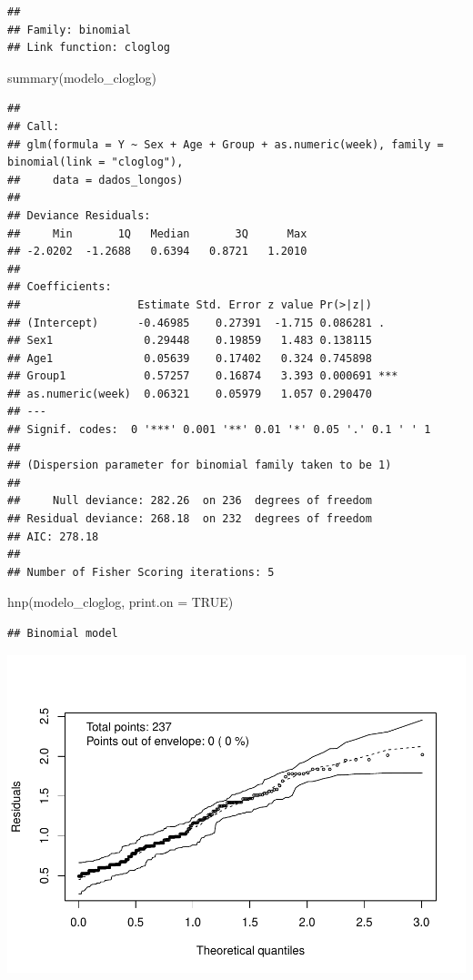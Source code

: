 \documentclass[
]{article}
\newenvironment{Shaded}{\begin{snugshade}}{\end{snugshade}}
\newcommand{\AttributeTok}[1]{\textcolor[rgb]{0.77,0.63,0.00}{#1}}
\newcommand{\ConstantTok}[1]{\textcolor[rgb]{0.00,0.00,0.00}{#1}}
\newcommand{\FunctionTok}[1]{\textcolor[rgb]{0.00,0.00,0.00}{#1}}
\newcommand{\NormalTok}[1]{#1}
\begin{document}
\begin{verbatim}
## 
## Family: binomial 
## Link function: cloglog
\end{verbatim}

\begin{Shaded}
\begin{Highlighting}[]
\FunctionTok{summary}\NormalTok{(modelo\_cloglog)}
\end{Highlighting}
\end{Shaded}

\begin{verbatim}
## 
## Call:
## glm(formula = Y ~ Sex + Age + Group + as.numeric(week), family = binomial(link = "cloglog"), 
##     data = dados_longos)
## 
## Deviance Residuals: 
##     Min       1Q   Median       3Q      Max  
## -2.0202  -1.2688   0.6394   0.8721   1.2010  
## 
## Coefficients:
##                  Estimate Std. Error z value Pr(>|z|)    
## (Intercept)      -0.46985    0.27391  -1.715 0.086281 .  
## Sex1              0.29448    0.19859   1.483 0.138115    
## Age1              0.05639    0.17402   0.324 0.745898    
## Group1            0.57257    0.16874   3.393 0.000691 ***
## as.numeric(week)  0.06321    0.05979   1.057 0.290470    
## ---
## Signif. codes:  0 '***' 0.001 '**' 0.01 '*' 0.05 '.' 0.1 ' ' 1
## 
## (Dispersion parameter for binomial family taken to be 1)
## 
##     Null deviance: 282.26  on 236  degrees of freedom
## Residual deviance: 268.18  on 232  degrees of freedom
## AIC: 278.18
## 
## Number of Fisher Scoring iterations: 5
\end{verbatim}

\begin{Shaded}
\begin{Highlighting}[]
\FunctionTok{hnp}\NormalTok{(modelo\_cloglog, }\AttributeTok{print.on =} \ConstantTok{TRUE}\NormalTok{)}
\end{Highlighting}
\end{Shaded}

\begin{verbatim}
## Binomial model
\end{verbatim}

\includegraphics{EDA__files/figure-latex/unnamed-chunk-9-1.pdf}
\end{document}
